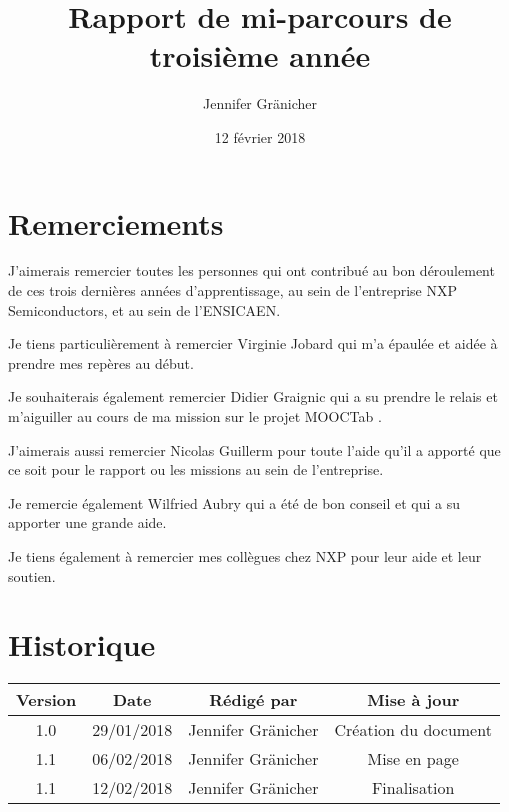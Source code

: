 \documentclass[french,12pt,a4paper,titlepage,openright,openbib]{report}
\title{Rapport de mi-parcours de troisième année}
\author{Jennifer Gr\"{a}nicher}
\date{12 février 2018}
\begin{document}



\maketitle

\chapter*{Remerciements}
J'aimerais remercier toutes les personnes qui ont contribué au bon déroulement de ces trois dernières années d'apprentissage, au sein de l'entreprise NXP Semiconductors, et au sein de l'ENSICAEN.

Je tiens particulièrement à remercier Virginie Jobard qui m'a épaulée et aidée à prendre mes repères au début.

Je souhaiterais également remercier Didier Graignic qui a su prendre le relais et m'aiguiller au cours de ma mission sur le projet MOOCTab \cite{website:mooctab} \cite{website:mooctabitea}.

J'aimerais aussi remercier Nicolas Guillerm pour toute l'aide qu'il a apporté que ce soit pour le rapport ou les missions au sein de l'entreprise.

Je remercie également Wilfried Aubry qui a été de bon conseil et qui a su apporter une grande aide.

Je tiens également à remercier mes collègues chez NXP pour leur aide et leur soutien.

\tableofcontents

\chapter*{Historique}
\begin{table}[ht]
	\label{tab:historique}
	\centering
	\begin{tabular}{|c|c|c|c|}
		\hline
		{\bf Version} & {\bf Date} & {\bf Rédigé par}    & {\bf Mise à jour}    \\
		\hline
		1.0           & 29/01/2018 & Jennifer Gränicher  & Création du document \\
		\hline
		1.1           & 06/02/2018 & Jennifer Gränicher  & Mise en page \\
		\hline
		1.1           & 12/02/2018 & Jennifer Gränicher  & Finalisation \\
		\hline
	\end{tabular}
\end{table}

\vspace{2cm}
\end{document}
